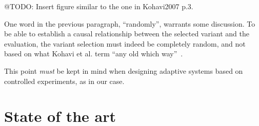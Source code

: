 @TODO: Insert figure similar to the one in Kohavi2007 p.3.

One word in the previous paragraph, ``randomly'', warrants some discussion. To be able to establish a causal relationship between the selected variant and the evaluation, the variant selection must indeed be completely random, and not based on what Kohavi et al. term ``any old which way''~\cite{Kohavi2007}.

This point \emph{must} be kept in mind when designing adaptive systems based on controlled experiments, as in our case.

\section{State of the art}
\label{survey:sub:state_of_the_art}



%
%
%
%
%
